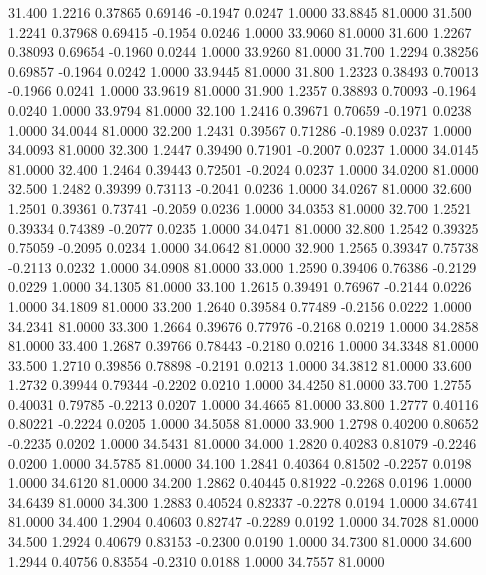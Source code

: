   31.400   1.2216   0.37865   0.69146  -0.1947   0.0247   1.0000  33.8845  81.0000
  31.500   1.2241   0.37968   0.69415  -0.1954   0.0246   1.0000  33.9060  81.0000
  31.600   1.2267   0.38093   0.69654  -0.1960   0.0244   1.0000  33.9260  81.0000
  31.700   1.2294   0.38256   0.69857  -0.1964   0.0242   1.0000  33.9445  81.0000
  31.800   1.2323   0.38493   0.70013  -0.1966   0.0241   1.0000  33.9619  81.0000
  31.900   1.2357   0.38893   0.70093  -0.1964   0.0240   1.0000  33.9794  81.0000
  32.100   1.2416   0.39671   0.70659  -0.1971   0.0238   1.0000  34.0044  81.0000
  32.200   1.2431   0.39567   0.71286  -0.1989   0.0237   1.0000  34.0093  81.0000
  32.300   1.2447   0.39490   0.71901  -0.2007   0.0237   1.0000  34.0145  81.0000
  32.400   1.2464   0.39443   0.72501  -0.2024   0.0237   1.0000  34.0200  81.0000
  32.500   1.2482   0.39399   0.73113  -0.2041   0.0236   1.0000  34.0267  81.0000
  32.600   1.2501   0.39361   0.73741  -0.2059   0.0236   1.0000  34.0353  81.0000
  32.700   1.2521   0.39334   0.74389  -0.2077   0.0235   1.0000  34.0471  81.0000
  32.800   1.2542   0.39325   0.75059  -0.2095   0.0234   1.0000  34.0642  81.0000
  32.900   1.2565   0.39347   0.75738  -0.2113   0.0232   1.0000  34.0908  81.0000
  33.000   1.2590   0.39406   0.76386  -0.2129   0.0229   1.0000  34.1305  81.0000
  33.100   1.2615   0.39491   0.76967  -0.2144   0.0226   1.0000  34.1809  81.0000
  33.200   1.2640   0.39584   0.77489  -0.2156   0.0222   1.0000  34.2341  81.0000
  33.300   1.2664   0.39676   0.77976  -0.2168   0.0219   1.0000  34.2858  81.0000
  33.400   1.2687   0.39766   0.78443  -0.2180   0.0216   1.0000  34.3348  81.0000
  33.500   1.2710   0.39856   0.78898  -0.2191   0.0213   1.0000  34.3812  81.0000
  33.600   1.2732   0.39944   0.79344  -0.2202   0.0210   1.0000  34.4250  81.0000
  33.700   1.2755   0.40031   0.79785  -0.2213   0.0207   1.0000  34.4665  81.0000
  33.800   1.2777   0.40116   0.80221  -0.2224   0.0205   1.0000  34.5058  81.0000
  33.900   1.2798   0.40200   0.80652  -0.2235   0.0202   1.0000  34.5431  81.0000
  34.000   1.2820   0.40283   0.81079  -0.2246   0.0200   1.0000  34.5785  81.0000
  34.100   1.2841   0.40364   0.81502  -0.2257   0.0198   1.0000  34.6120  81.0000
  34.200   1.2862   0.40445   0.81922  -0.2268   0.0196   1.0000  34.6439  81.0000
  34.300   1.2883   0.40524   0.82337  -0.2278   0.0194   1.0000  34.6741  81.0000
  34.400   1.2904   0.40603   0.82747  -0.2289   0.0192   1.0000  34.7028  81.0000
  34.500   1.2924   0.40679   0.83153  -0.2300   0.0190   1.0000  34.7300  81.0000
  34.600   1.2944   0.40756   0.83554  -0.2310   0.0188   1.0000  34.7557  81.0000
